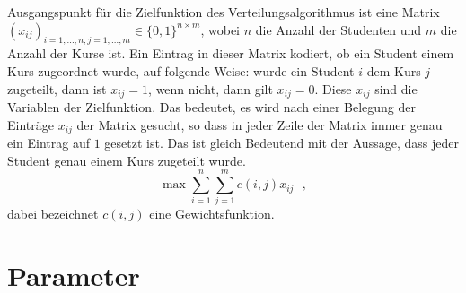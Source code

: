         Ausgangspunkt für die Zielfunktion des Verteilungsalgorithmus ist eine Matrix $ (x_{ij})_{i=1,...,n;j=1,...,m} \in \{0,1\}^{n \times m}$, wobei $ n $ die Anzahl der Studenten und $ m $ die Anzahl der Kurse ist.
        Ein Eintrag in dieser Matrix kodiert, ob ein Student einem Kurs zugeordnet wurde, auf folgende Weise:
        wurde ein Student $ i $ dem Kurs $ j $ zugeteilt, dann ist $ x_{ij} = 1 $, wenn nicht, dann gilt $ x_{ij} = 0 $. 
        Diese $ x_{ij} $ sind die Variablen der Zielfunktion.
        Das bedeutet, es wird nach einer Belegung der Einträge $ x_{ij} $ der Matrix gesucht, so dass in jeder Zeile der Matrix immer genau ein Eintrag auf $ 1 $ gesetzt ist.
        Das ist gleich Bedeutend mit der Aussage, dass jeder Student genau einem Kurs zugeteilt wurde.
            $$ \max \sum_{i=1}^{n} \sum_{j=1}^{m} c(i,j)x_{ij}  ~~~,$$
        dabei bezeichnet $ c(i,j) $ eine Gewichtsfunktion. 
                
                
                
        \section{Parameter}